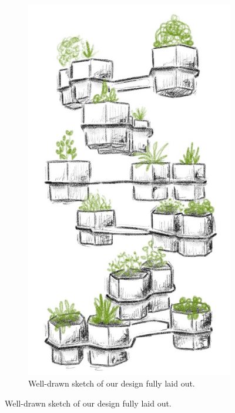 \documentclass[12pt]{extarticle} %
\begin{document}
\begin{figure}[ht]
     \centering
     \begin{subfigure}[b]{0.4\textwidth}
         \centering
         \includegraphics[width=\textwidth]{images/sketches/plant_pot_sketch.jpg}
         \caption{Well-drawn sketch of our design fully laid out.}
         \label{fig:whole_pot_sketch}
     \end{subfigure}

\end{figure}
\end{document}
